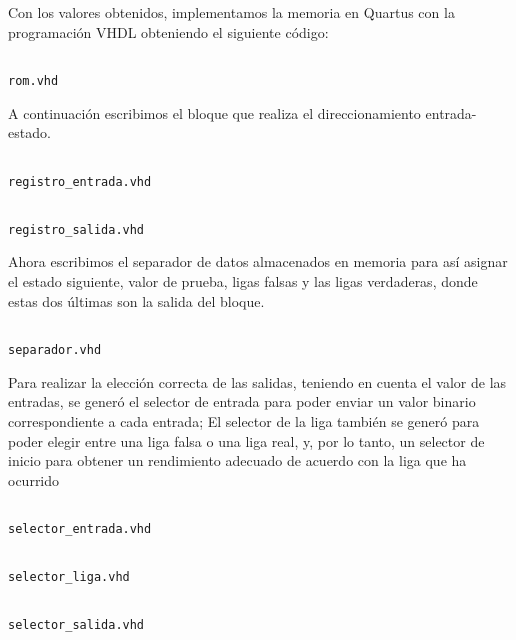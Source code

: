 \documentclass[table]{scrartcl}
\newenvironment{code}{\captionsetup{type=listing}}{}
\begin{document}
Con los valores obtenidos, implementamos la memoria en Quartus con la
programación VHDL obteniendo el siguiente código:
\begin{code}
  \inputminted{vhdl}{./rom.vhd}
  \caption{\texttt{rom.vhd}}
\end{code}
A continuación escribimos el bloque que realiza el direccionamiento
entrada-estado.
\begin{code}
  \inputminted{vhdl}{./registro_entrada.vhd}
  \caption{\texttt{registro_entrada.vhd}}
\end{code}
\begin{code}
  \inputminted{vhdl}{./registro_salida.vhd}
  \caption{\texttt{registro_salida.vhd}}
\end{code}
Ahora escribimos el separador de datos almacenados en memoria para así
asignar el estado siguiente, valor de prueba, ligas falsas y las ligas
verdaderas, donde estas dos últimas son la salida del bloque.
\begin{code}
  \inputminted{vhdl}{./separador.vhd}
  \caption{\texttt{separador.vhd}}
\end{code}
Para realizar la elección correcta de las salidas, teniendo en cuenta el valor
de las entradas, se generó el selector de entrada para poder enviar un valor
binario correspondiente a cada entrada; El selector de la liga también se
generó para poder elegir entre una liga falsa o una liga real, y, por lo tanto, un
selector de inicio para obtener un rendimiento adecuado de acuerdo con la
liga que ha ocurrido
\begin{code}
  \inputminted{vhdl}{./selector_entrada.vhd}
  \caption{\texttt{selector_entrada.vhd}}
\end{code}
\begin{code}
  \inputminted{vhdl}{./selector_liga.vhd}
  \caption{\texttt{selector_liga.vhd}}
\end{code}
\begin{code}
  \inputminted{vhdl}{./selector_salida.vhd}
  \caption{\texttt{selector_salida.vhd}}
\end{code}
\newpage{}
\end{document}
